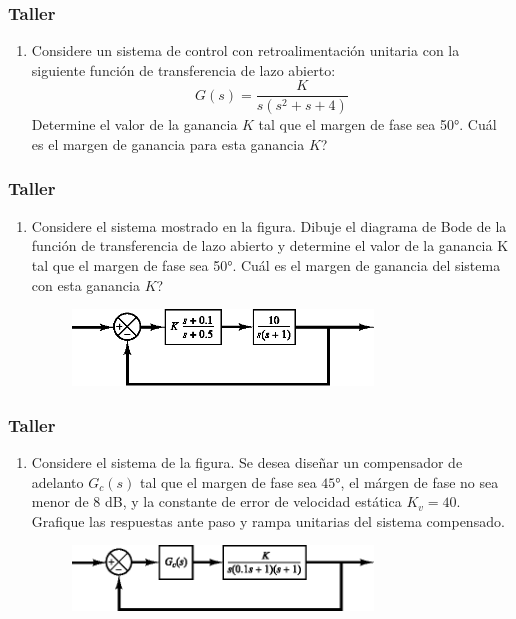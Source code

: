 \documentclass[aspectratio=169]{beamer}
\theoremstyle{definition}
\theoremstyle{plain}
\theoremstyle{remark}
\newcounter{saveenumi}
\newcommand{\seti}{\setcounter{saveenumi}{\value{enumi}}}
\newcommand{\conti}{\setcounter{enumi}{\value{saveenumi}}}
\begin{document}
\begin{frame}[c]\frametitle{Taller}
\begin{enumerate}
	\conti
	\item Considere un sistema de control con retroalimentación unitaria con la siguiente función de transferencia de lazo abierto:
	\begin{equation*}
		G(s) = \frac{K}{s(s^2+s+4)}
	\end{equation*}
	Determine el valor de la ganancia $K$ tal que el margen de fase sea \ang{50}. Cuál es el margen de ganancia para esta ganancia $K$?
	\seti 
\end{enumerate}
\end{frame}

\begin{frame}[c]\frametitle{Taller}
\begin{enumerate}
	\conti
	\item Considere el sistema mostrado en la figura. Dibuje el diagrama de Bode de la función de transferencia de lazo abierto y determine el valor de la ganancia K tal que el margen de fase sea \ang{50}. Cuál es el margen de ganancia del sistema con esta ganancia $K$?
	\begin{figure}
		\centering
		\includegraphics[width=8cm]{images/exercise3.eps}
	\end{figure}
	\seti 
\end{enumerate}
\end{frame}

\begin{frame}[c]\frametitle{Taller}
\begin{enumerate}
	\conti
	\item Considere el sistema de la figura. Se desea diseñar un compensador de adelanto $G_c(s)$ tal que el margen de fase sea $\ang{45}$, el márgen de fase no sea menor de 8 dB, y la constante de error de velocidad estática $K_v = 40$. Grafique las respuestas ante paso y rampa unitarias del sistema compensado.
	\begin{figure}
		\centering
		\includegraphics[width=8cm]{images/exercise4.eps}
	\end{figure}
	\seti 
\end{enumerate}
\end{frame}
\end{document}
